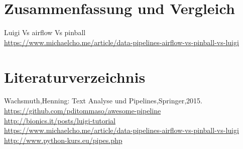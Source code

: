 \documentclass[t]{beamer}       %
\begin{document}
\section{Zusammenfassung und Vergleich}
\begin{frame}

Luigi Vs airflow Vs pinball\\
\bigskip
\url{https://www.michaelcho.me/article/data-pipelines-airflow-vs-pinball-vs-luigi}\\


\end{frame}




\section{Literaturverzeichnis}
\begin{frame}
Wachsmuth,Henning: Text Analyse und Pipelines,Springer,2015.\\
\url{https://github.com/pditommaso/awesome-pipeline}\\
\url{http://bionics.it/posts/luigi-tutorial}\\
\url{https://www.michaelcho.me/article/data-pipelines-airflow-vs-pinball-vs-luigi}\\
\url{http://www.python-kurs.eu/pipes.php}
\end{frame}
\end{document}
